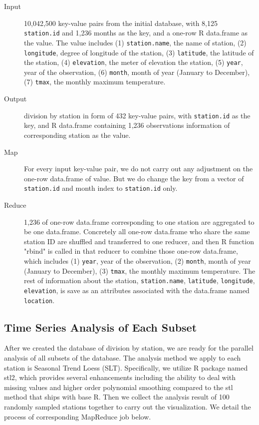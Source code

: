 \begin{description}
  \item[Input] 10,042,500 key-value pairs from the initial database, with 8,125 
  \texttt{station.id} and 1,236 months as the key, and a one-row R data.frame 
  as the value. The value includes (1) \texttt{station.name}, the name of station, 
  (2) \texttt{longitude}, degree of longitude of the station, (3) \texttt{latitude}, 
  the latitude of the station, (4) \texttt{elevation}, the meter of elevation the 
  station, (5) \texttt{year}, year of the observation, (6) \texttt{month}, month 
  of year (January to December), (7) \texttt{tmax}, the monthly maximum temperature.
  \item[Output] division by station in form of 432 key-value pairs, with 
  \texttt{station.id} as the key, and R data.frame containing 1,236 observations
  information of corresponding station as the value.
  \item[Map]For every input key-value pair, we do not carry out any adjustment on
  the one-row data.frame of value. But we do change the key from a vector of 
  \texttt{station.id} and month index to \texttt{station.id} only. 
  \item[Reduce] 1,236 of one-row data.frame corresponding to one station are 
  aggregated to be one data.frame. Concretely all one-row data.frame who share
  the same station ID are shuffled and transferred to one reducer, and then R function 
  "rbind" is called in that reducer to combine those one-row data.frame, which includes
  (1) \texttt{year}, year of the observation, (2) \texttt{month}, month of year 
  (January to December), (3) \texttt{tmax}, the monthly maximum temperature. The 
  rest of information about the station, \texttt{station.name}, \texttt{latitude},
  \texttt{longitude}, \texttt{elevation}, is save as an attributes associated with 
  the data.frame named \texttt{location}.
\end{description}

\subsection{Time Series Analysis of Each Subset}

After we created the database of division by station, we are ready for the parallel 
analysis of all subsets of the database. The analysis method we apply to each station
is Seasonal Trend Loess (SLT). Specifically, we utilize R package named stl2\cite{stl2},
which provides several enhancements including the ability to deal with missing values 
and higher order polynomial smoothing compared to the stl method that ships with 
base R. Then we collect the analysis result of 100 randomly sampled stations together 
to carry out the visualization. We detail the process of corresponding MapReduce 
job below.

